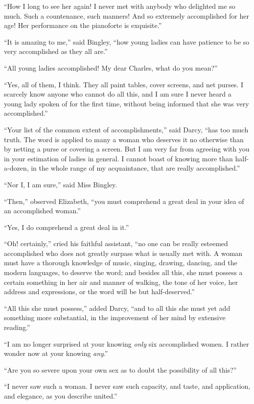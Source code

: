``How I long to see her again!  I never met with anybody who
delighted me so much.  Such a countenance, such manners!  And
so extremely accomplished for her age!  Her performance on the
pianoforte is exquisite.''

``It is amazing to me,'' said Bingley, ``how young ladies can have
patience to be so very accomplished as they all are.''

``All young ladies accomplished!  My dear Charles, what do you mean?''

``Yes, all of them, I think.  They all paint tables, cover screens,
and net purses.  I scarcely know anyone who cannot do all this,
and I am sure I never heard a young lady spoken of for the first
time, without being informed that she was very accomplished.''

``Your list of the common extent of accomplishments,'' said Darcy,
``has too much truth.  The word is applied to many a woman who
deserves it no otherwise than by netting a purse or covering
a screen.  But I am very far from agreeing with you in your
estimation of ladies in general.  I cannot boast of knowing
more than half-a-dozen, in the whole range of my acquaintance,
that are really accomplished.''

``Nor I, I am sure,'' said Miss Bingley.

``Then,'' observed Elizabeth, ``you must comprehend a great deal
in your idea of an accomplished woman.''

``Yes, I do comprehend a great deal in it.''

``Oh! certainly,'' cried his faithful assistant, ``no one can be really
esteemed accomplished who does not greatly surpass what is
usually met with.  A woman must have a thorough knowledge of
music, singing, drawing, dancing, and the modern languages, to
deserve the word; and besides all this, she must possess a certain
something in her air and manner of walking, the tone of her
voice, her address and expressions, or the word will be but
half-deserved.''

``All this she must possess,'' added Darcy, ``and to all this she
must yet add something more substantial, in the improvement of
her mind by extensive reading.''

``I am no longer surprised at your knowing \emph{only} six accomplished
women.  I rather wonder now at your knowing \emph{any}.''

``Are you so severe upon your own sex as to doubt the possibility
of all this?''

``I never saw such a woman.  I never saw such capacity, and
taste, and application, and elegance, as you describe united.''

